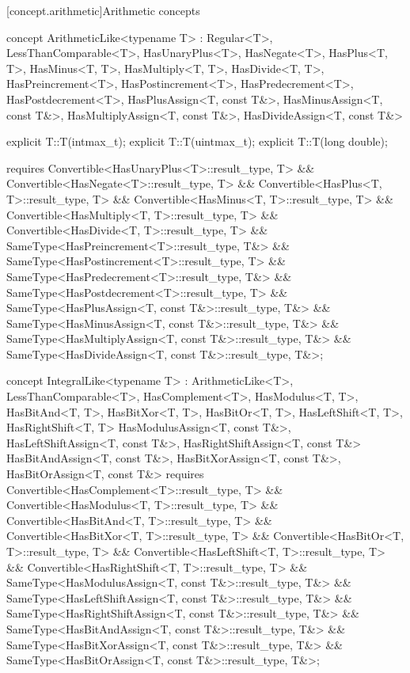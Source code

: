 \documentclass[american,twoside]{book}
\begin{document}
[concept.arithmetic]{Arithmetic concepts}

\begin{itemdecl}
concept ArithmeticLike<typename T> 
  : Regular<T>, LessThanComparable<T>, HasUnaryPlus<T>, HasNegate<T>,
    HasPlus<T, T>, HasMinus<T, T>, HasMultiply<T, T>, HasDivide<T, T>, 
    HasPreincrement<T>, HasPostincrement<T>, HasPredecrement<T>, HasPostdecrement<T>,
    HasPlusAssign<T, const T&>, HasMinusAssign<T, const T&>,
    HasMultiplyAssign<T, const T&>, HasDivideAssign<T, const T&> {
  explicit T::T(intmax_t);
  explicit T::T(uintmax_t);
  explicit T::T(long double);

  requires Convertible<HasUnaryPlus<T>::result_type, T>
        && Convertible<HasNegate<T>::result_type, T>
        && Convertible<HasPlus<T, T>::result_type, T>
        && Convertible<HasMinus<T, T>::result_type, T>
        && Convertible<HasMultiply<T, T>::result_type, T>
        && Convertible<HasDivide<T, T>::result_type, T>
        && SameType<HasPreincrement<T>::result_type, T&>
        && SameType<HasPostincrement<T>::result_type, T>
        && SameType<HasPredecrement<T>::result_type, T&>
        && SameType<HasPostdecrement<T>::result_type, T>
        && SameType<HasPlusAssign<T, const T&>::result_type, T&>
        && SameType<HasMinusAssign<T, const T&>::result_type, T&>
        && SameType<HasMultiplyAssign<T, const T&>::result_type, T&>
        && SameType<HasDivideAssign<T, const T&>::result_type, T&>;
}
\end{itemdecl}

\begin{itemdescr}
\pnum
{}
\end{itemdescr}

\begin{itemdecl}
concept IntegralLike<typename T> 
  : ArithmeticLike<T>, LessThanComparable<T>,
    HasComplement<T>, HasModulus<T, T>, HasBitAnd<T, T>, HasBitXor<T, T>, HasBitOr<T, T>,
    HasLeftShift<T, T>, HasRightShift<T, T> 
    HasModulusAssign<T, const T&>, HasLeftShiftAssign<T, const T&>, HasRightShiftAssign<T, const T&>
    HasBitAndAssign<T, const T&>, HasBitXorAssign<T, const T&>, HasBitOrAssign<T, const T&> {
  requires Convertible<HasComplement<T>::result_type, T>
        && Convertible<HasModulus<T, T>::result_type, T>
        && Convertible<HasBitAnd<T, T>::result_type, T>
        && Convertible<HasBitXor<T, T>::result_type, T>
        && Convertible<HasBitOr<T, T>::result_type, T>
        && Convertible<HasLeftShift<T, T>::result_type, T>
        && Convertible<HasRightShift<T, T>::result_type, T>
        && SameType<HasModulusAssign<T, const T&>::result_type, T&>
        && SameType<HasLeftShiftAssign<T, const T&>::result_type, T&>
        && SameType<HasRightShiftAssign<T, const T&>::result_type, T&>
        && SameType<HasBitAndAssign<T, const T&>::result_type, T&>
        && SameType<HasBitXorAssign<T, const T&>::result_type, T&>
        && SameType<HasBitOrAssign<T, const T&>::result_type, T&>;
}
\end{itemdecl}
\end{document}
